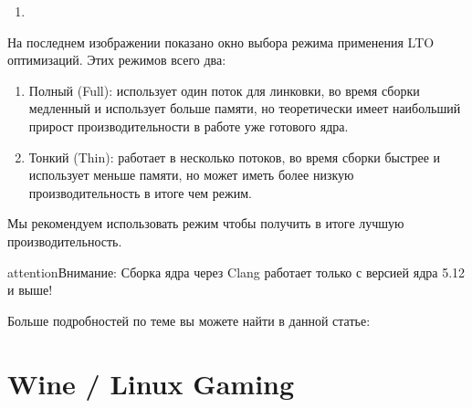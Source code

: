 \documentclass[letterpaper,10pt,russian,openany]{sphinxmanual}
\begin{document}
\noindent{}
\begin{enumerate}
%
\setcounter{enumi}{2}
\item {} 
\end{enumerate}

\noindent{}

\sphinxAtStartPar
На последнем изображении показано окно выбора режима применения LTO оптимизаций.
Этих режимов всего два:
\begin{enumerate}
%
\item {} 
\sphinxAtStartPar
Полный (Full): использует один поток для линковки, во время сборки медленный и использует больше памяти,
но теоретически имеет наибольший прирост производительности в работе уже готового ядра.

\item {} 
\sphinxAtStartPar
Тонкий (Thin): работает в несколько потоков, во время сборки быстрее и использует меньше памяти, но может иметь более низкую производительность в итоге чем  режим.

\end{enumerate}

\sphinxAtStartPar
Мы рекомендуем использовать  режим чтобы получить в итоге лучшую производительность.

\begin{sphinxadmonition}{attention}{Внимание:}
\sphinxAtStartPar
Сборка ядра через Clang работает только с версией ядра 5.12 и выше!
\end{sphinxadmonition}

\sphinxAtStartPar
Больше подробностей по теме вы можете найти в данной статье:

\sphinxAtStartPar
{}

\sphinxstepscope


\chapter{Wine / Linux Gaming}
\label{\detokenize{source/linux-gaming:wine-linux-gaming}}\label{\detokenize{source/linux-gaming:linux-gaming}}\label{\detokenize{source/linux-gaming::doc}}
\ignorespaces 
\end{document}
